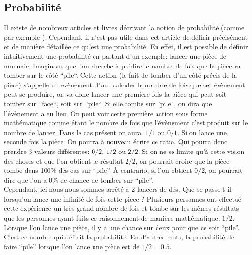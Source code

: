 \documentclass[letterpaper]{article}
\begin{document}
  \subsection{Probabilité}
    \label{probabilite}
    Il existe de nombreux articles et livres décrivant la notion de probabilité 
    (comme par exemple \citep{IP}).  Cependant, il n'est pas utile dans cet
    article de définir précisément et de manière détaillée ce qu'est une 
    probabilité.  En effet, il est possible de définir intuitivement une
    probabilité en partant d'un exemple: lancer une pièce de monnaie.
    Imaginons que l'on cherche à prédire le nombre de fois que la pièce
    va tomber sur le côté ``pile``.  Cette action (le fait de tomber d'un 
    côté précis de la pièce) s'appelle un évènement.  Pour calculer
    le nombre de fois que cet évènement peut se produire, on va donc
    lancer une première fois la pièce qui peut soit tomber
    sur ''face``, soit sur ''pile``.  Si elle tombe sur ''pile'', 
    on dira que l'évènement a eu lieu.  On peut voir cette première
    action sous forme mathématique comme étant le nombre de fois
    que l'évènement c'est produit sur le nombre de lancer.  Dans le cas
    présent on aura: $1/1$ ou $0/1$.  Si on lance une seconde fois
    la pièce.  On pourra à nouveau écrire ce ratio.  Qui pourra donc 
    prendre 3 valeurs différentes: $0/2$, $1/2$ ou $2/2$.  Si on ne se
    limite qu'à cette vision des choses et que l'on obtient le résultat
    $2/2$, on pourrait croire que la pièce tombe dans 100\% des cas
    sur ``pile''.  À contrario, si l'on obtient $0/2$, on pourrait
    dire que l'on a 0\% de chance de tomber sur ``pile''.\\
    Cependant, ici nous nous sommes arrêté à 2 lancers de dés.  Que se
    passe-t-il lorsqu'on lance une infinité de fois cette pièce ?
    Plusieurs personnes ont effectué cette expérience un très grand
    nombre de fois et tombe sur les mêmes résultats que les personnes
    ayant faits ce raisonnement de manière mathématique: $1/2$.
    Lorsque l'on lance une pièce, il y a une chance sur deux pour que
    ce soit ``pile''.  C'est ce nombre qui définit la probabilité.
    En d'autres mots, la probabilité de faire ``pile'' lorsque l'on 
    lance une pièce est de $1/2 = 0.5$.
    
    
    
\end{document}
